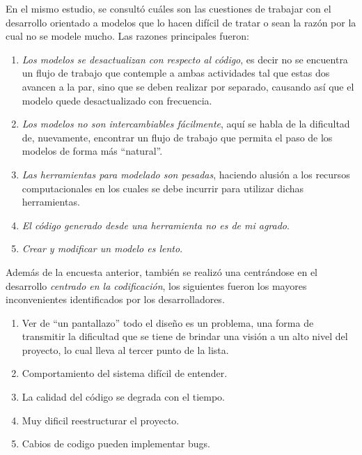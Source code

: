 En el mismo estudio, se consultó cuáles son las cuestiones de trabajar con el
desarrollo orientado a modelos que lo hacen difícil de tratar o sean la razón
por la cual no se modele mucho. Las razones principales fueron:
\begin{enumerate}
	\item \textit{Los modelos se desactualizan con respecto al código},
		es decir no se encuentra un flujo de trabajo que contemple a ambas
		actividades tal que estas dos avancen a la par, sino que se deben
		realizar por separado, causando así que el modelo quede desactualizado
		con frecuencia.
	\item \textit{Los modelos no son intercambiables fácilmente}, aquí se habla de la
		dificultad de, nuevamente, encontrar un flujo de trabajo que permita el paso de
		los modelos de forma más ``natural''.
	\item \textit{Las herramientas para modelado son pesadas}, haciendo alusión a los
		recursos computacionales en los cuales se debe incurrir para utilizar dichas
		herramientas.
		\item \textit{El código generado desde una herramienta no es de mi agrado}.
		\item \textit{Crear y modificar un modelo es lento}.
	\end{enumerate}

Además de la encuesta anterior, también se realizó
una centrándose en el desarrollo \textit{centrado en la codificación}, los
siguientes fueron los mayores inconvenientes identificados por los desarrolladores.

\begin{enumerate}
	\item Ver de ``un pantallazo'' todo el diseño es un problema, una forma de
		transmitir la dificultad que se tiene de brindar una visión a un alto nivel
		del proyecto, lo cual lleva al tercer punto de la lista.
	\item Comportamiento del sistema difícil de entender.
	\item La calidad del código se degrada con el tiempo.
	\item Muy dificil reestructurar el proyecto.
	\item Cabios de codigo pueden implementar bugs.
\end{enumerate}

